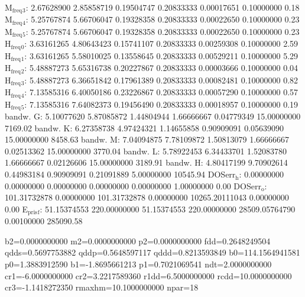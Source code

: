 \documentclass[11pt]{article}
\begin{document}
M\(_{\text{freq}}\)\(_{\text{3}}\):   2.67628900   2.85858719   0.19504747   0.20833333   0.00017651   0.10000000         0.18
M\(_{\text{freq}}\)\(_{\text{4}}\):   5.25767874   5.66706047   0.19328358   0.20833333   0.00022650   0.10000000         0.23
M\(_{\text{freq}}\)\(_{\text{5}}\):   5.25767874   5.66706047   0.19328358   0.20833333   0.00022650   0.10000000         0.23
H\(_{\text{freq}}\)\(_{\text{0}}\):   3.63161265   4.80643423   0.15741107   0.20833333   0.00259308   0.10000000         2.59
H\(_{\text{freq}}\)\(_{\text{1}}\):   3.63161265   5.58010025   0.13558645   0.20833333   0.00529211   0.10000000         5.29
H\(_{\text{freq}}\)\(_{\text{2}}\):   5.48887273   5.65316738   0.20227867   0.20833333   0.00003666   0.10000000         0.04
H\(_{\text{freq}}\)\(_{\text{3}}\):   5.48887273   6.36651842   0.17961389   0.20833333   0.00082481   0.10000000         0.82
H\(_{\text{freq}}\)\(_{\text{4}}\):   7.13585316   6.40050186   0.23226867   0.20833333   0.00057290   0.10000000         0.57
H\(_{\text{freq}}\)\(_{\text{5}}\):   7.13585316   7.64082373   0.19456490   0.20833333   0.00018957   0.10000000         0.19
bandw. G:   5.10077620   5.87085872   1.44804944   1.66666667   0.04779349  15.00000000      7169.02
bandw. K:   6.27358738   4.97424321   1.14655858   0.90909091   0.05639090  15.00000000      8458.63
bandw. M:   7.04094875   7.78109872   1.50813079   1.66666667   0.02513362  15.00000000      3770.04
bandw. L:   5.78922453   6.34433701   1.52083780   1.66666667   0.02126606  15.00000000      3189.91
bandw. H:   4.80417199   9.70902614   0.44983184   0.90909091   0.21091889   5.00000000     10545.94
DOSerr\(_{\text{h}}\):   0.00000000   0.00000000   0.00000000   0.00000000   0.00000000   1.00000000         0.00
DOSerr\(_{\text{o}}\): 101.31732878   0.00000000 101.31732878   0.00000000 10265.20111043   0.00000000         0.00
E\(_{\text{pris}}\)\(_{\text{f}}\):  51.15374553 220.00000000  51.15374553 220.00000000 28509.05764790   0.00100000    285090.58

b2=0.0000000000 m2=0.0000000000 p2=0.0000000000 fdd=0.2648249504 qdds=0.5697753882 qddp=0.5648597117 qddd=0.8213593849 b0=114.1564941581 p0=1.3883912590 b1=-1.8695661213 p1=0.7021069541 ndt=2.0000000000 cr1=-6.0000000000 cr2=3.2217589360 r1dd=6.5000000000 rcdd=10.0000000000 cr3=-1.1418272350 rmaxhm=10.1000000000 npar=18 
\end{document}
